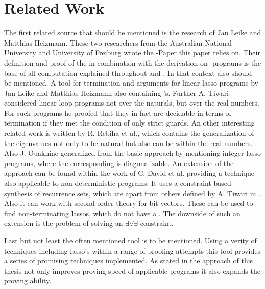 \chapter{Related Work}
\label{chapter:related-work}

The first related source that should be mentioned is the research of Jan Leike and Matthias Heizmann. These two researchers from the Australian National University and University of Freiburg wrote the \gna-Paper this paper relies on. Their definition and proof of the \gna in combination with the derivation on \lasso-programs is the base of all computation explained throughout  and . \cite{leike2014geometric} \newline
In that context also  should be mentioned. A tool for termination and \nonterm arguments for linear lasso programs by Jan Leike and Matthias Heizmann also containing \gna's. \cite{LassoRanker}\newline
Further A. Tiwari considered linear loop programs not over the naturals, but over the real numbers. For such programs he proofed that they in fact are decidable in terms of termination if they met the condition of only strict guards. \cite{tiwari2004termination} \newline
An other interesting related work is written by R. Rebiha et al., which contains the generalization of the eigenvalues not only to be natural but also can be within the real numbers. \cite{rebiha2014characterization} Also J. Ouaknine generalized from the basic approach by mentioning integer lasso programs, where the corresponding \updatematrix is diagonalizable. \cite{ouaknine2014termination} \newline
An extension of the \gna approach can be found within the work of C. David et al. providing a technique also applicable to non deterministic programs. It uses a constraint-based synthesis of recurrence sets, which are apart from others defined by A. Tiwari in \cite{tiwari2004termination}. Also it can work with second order theory for bit vectors. These can be used to find non-terminating lassos, which do not have a \gna. The downside of such an extension is the problem of solving an $\exists\forall\exists$-constraint. \cite{david2015unrestricted} \cite{leike2014geometric}

Last but not least the often mentioned tool \aprove is to be mentioned. Using a verity of techniques including lasso's within a range of proofing attempts this tool provides a series of promising techniques implemented. 
As stated in  the approach of this thesis not only improves proving speed of applicable programs it also expands the proving ability. 